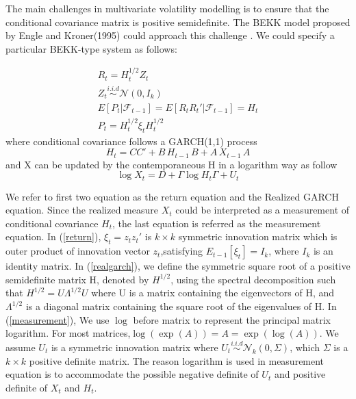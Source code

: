 \documentclass[titlepage,11pt]{article}
\begin{document}
The main challenges in multivariate volatility modelling is to ensure that the conditional covariance matrix is positive semidefinite. The BEKK model proposed by Engle and Kroner(1995) could approach this challenge .
We could specify a particular BEKK-type system as follows:


\begin{align}
	\label{return}
	R_t = H_t^{1/2} Z_t \nonumber\\
	Z_t \overset{i.i.d} {\sim} \mathcal{N}(0,I_k) \nonumber\\
	E[P_t|\mathcal{F}_{t-1}]=E[R_t R_t'|\mathcal{F}_{t-1}]=H_t \nonumber\\
	P_t = H_t^{1/2}\xi_t H_t^{1/2}
\end{align}
where conditional covariance follows a GARCH(1,1) process
\begin{equation}
	\label{realgarch}
	 H_t=CC'+ B\,  H_{t-1} \,B+A \,  X_{t-1} \, A
\end{equation}
and X can be updated by the contemporaneous H in a logarithm way as follow 
\begin{equation}
	\label{measurement}
	 \log X_t= D+ \Gamma \log H_t \Gamma + U_t
\end{equation}

We refer to first two equation as the return equation and the Realized GARCH equation. Since the realized measure $X_t$ could be interpreted as a measurement of conditional covariance $H_t$, the last equation is referred as the measurement equation.
  In (\ref{return}), $\xi_t = z_t z_t'$ is $k \times k$ symmetric innovation matrix which is outer product of innovation vector $z_t$,satisfying $E_{t-1}[\xi_t]=I_k$, where $I_k$ is an identity matrix. 
In (\ref{realgarch}), we define the symmetric square root of a positive semidefinite matrix H, denoted by $H^{1/2}$, using the spectral decomposition such that $H^{1/2} = U \Lambda^{1/2} U$ where U is a matrix containing the eigenvectors of H, and $\Lambda^{1/2}$ is a diagonal matrix containing the square root of the eigenvalues of H. In (\ref{measurement}), We use $\log$ before matrix to represent the principal matrix logarithm. For most matrices,$\log (\exp(A)) = A =\exp(\log(A))$. We assume $U_t$ is a symmetric innovation matrix where $U_t \overset{i.i.d} {\sim} \mathcal{N}_k(0,\Sigma)$, which $\Sigma$ is a $k \times k$ positive definite matrix. The reason logarithm is used in measurement equation is to accommodate the possible negative definite of $U_t$ and positive definite of $X_t$ and $H_t$.
\end{document}
